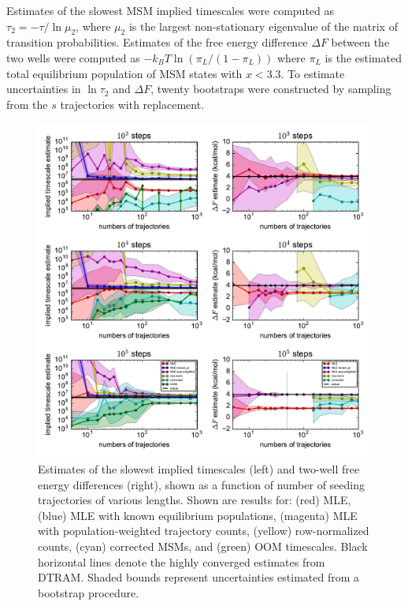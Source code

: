 \documentclass[%
 aip,
rsi,%
 amsmath,amssymb,
 reprint,%
]{revtex4-1}
\begin{document}
Estimates of the slowest MSM implied timescales were computed as $\tau_2 = -\tau/\ln \mu_2$, where $\mu_2$ is the largest non-stationary eigenvalue of the matrix of transition probabilities.  Estimates of the free energy difference $\Delta F$ between the two wells were computed as $-k_BT \ln (\pi_L/(1-\pi_L))$ where $\pi_L$ is the estimated total equilibrium population of MSM states with $x<3.3$. To estimate uncertainties in $\ln \tau_2$ and $\Delta F$, twenty bootstraps were constructed by sampling from the $s$ trajectories with replacement.

\begin{figure}
\includegraphics[width=1.7\columnwidth]{figures/convergence_oct2018.pdf}%
\caption{\label{fig:toy-estimation}Estimates of the slowest implied timescales (left) and two-well free energy differences (right), shown as a function of number of seeding trajectories of various lengths. Shown are results for: (red) MLE, (blue) MLE with known equilibrium populations, (magenta) MLE with population-weighted trajectory counts, (yellow) row-normalized counts, (cyan) corrected MSMs, and (green) OOM timescales. Black horizontal lines denote the highly converged estimates from DTRAM.  Shaded bounds represent uncertainties estimated from a bootstrap procedure.}
\end{figure}
\end{document}
